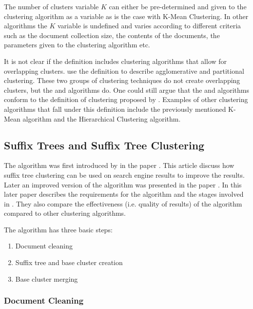 The number of clusters variable \(K\) can either be pre-determined and given to the clustering algorithm as a variable as is the case with K-Mean Clustering. In other algorithms the \(K\) variable is undefined and varies according to different criteria such as the document collection size, the contents of the documents, the parameters given to the clustering algorithm etc.

It is not clear if the definition includes clustering algorithms that allow for overlapping clusters. \citeauthor{Baeza-Yates2011a} use the definition to describe agglomerative and partitional clustering. These two groups of clustering techniques do not create overlapping clusters, but the \STC and \CTC algorithms do. One could still argue that the \STC and \CTC algorithms conform to the definition of clustering proposed by \citeauthor{Baeza-Yates2011a}. Examples of other clustering algorithms that fall under this definition include the previously mentioned K-Mean algorithm and the Hierarchical Clustering algorithm.

\subsection{Suffix Trees and Suffix Tree Clustering}
The \STC algorithm was first introduced by \textcite{Oren1997} in the paper . This article discuss how suffix tree clustering can be used on search engine results to improve the results. Later an improved version of the algorithm was presented in the paper  \cite{Oren1998}. In this later paper \citeauthor{Oren1998} describes the requirements for the \STC algorithm and the stages involved in \STC. They also compare the effectiveness (i.e. quality of results) of the algorithm compared to other clustering algorithms.

The \STC algorithm has three basic steps:
\begin{enumerate}
\item Document cleaning
\item Suffix tree and base cluster creation
\item Base cluster merging
\end{enumerate}

\subsubsection{Document Cleaning}

